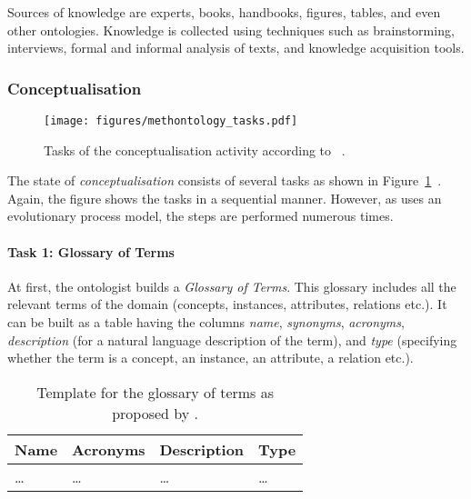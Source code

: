 Sources of knowledge are experts, books, handbooks, figures, tables, and even other ontologies. Knowledge is collected using techniques such as brainstorming, interviews, formal and informal analysis of texts, and knowledge acquisition tools.

\subsubsection{Conceptualisation}
\label{subsec:methontology_conceptualisation}
\begin{figure}
  \texttt{[image: figures/methontology\_tasks.pdf]}
  \caption[Tasks of the conceptualisation activity]{Tasks of the conceptualisation activity according to \methontology~\cite{MethontologyLegal}.}
  \label{fig:methontology2}
\end{figure}

The state of \emph{conceptualisation} consists of several tasks as shown in Figure~\ref{fig:methontology2}~\cite{MethontologyLegal}. Again, the figure shows the tasks in a sequential manner. However, as \methontology uses an evolutionary process model, the steps are performed numerous times.

\paragraph{Task 1: Glossary of Terms}

At first, the ontologist builds a \emph{Glossary of Terms}. This glossary includes all the relevant terms of the domain (concepts, instances, attributes, relations etc.). It can be built as a table having the columns \emph{name}, \emph{synonyms}, \emph{acronyms}, \emph{description} (for a natural language description of the term), and \emph{type} (specifying whether the term is a concept, an instance, an attribute, a relation etc.).

\begin{table}
\centering
\begin{tabular}{|p{}|p{}|p{}|p{}|}
  \hline
  \textbf{Name} & \textbf{Acronyms} & \textbf{Description} & \textbf{Type} \\
  \hline\hline
  … & … & … & … \\
  \hline
\end{tabular}
\caption[Template for the glossary of terms]{Template for the glossary of terms as proposed by \methontology.}
\label{table:methontology_example_glossary}
\end{table}

